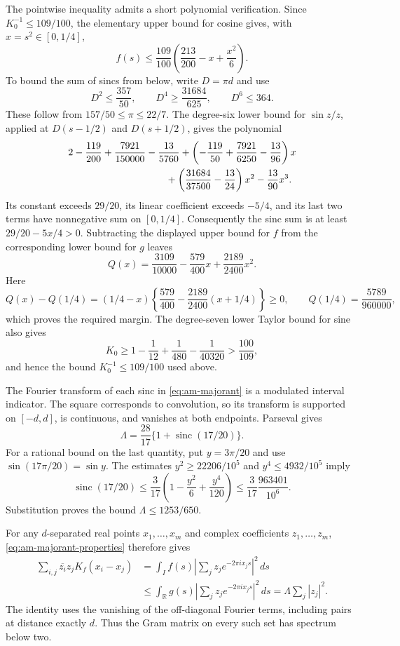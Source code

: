 \documentclass[11pt,reqno]{amsart}
\numberwithin{equation}{section}
\begin{document}
The pointwise inequality admits a short polynomial verification.
Since $K_0^{-1}\le109/100$, the elementary upper bound for cosine gives,
with $x=s^2\in[0,1/4]$,
\[
 f(s)\le\frac{109}{100}
       \left(\frac{213}{200}-x+\frac{x^2}{6}\right).
\]
To bound the sum of sincs from below, write $D=\pi d$ and use
\[
 D^2\le\frac{357}{50},\qquad
 D^4\ge\frac{31684}{625},\qquad D^6\le364.
\]
These follow from $157/50\le\pi\le22/7$. The degree-six lower
bound for $\sin z/z$, applied at $D(s-1/2)$ and $D(s+1/2)$,
gives the polynomial
\[
\begin{split}
 &2-\frac{119}{200}+\frac{7921}{150000}-\frac{13}{5760}
 +\left(-\frac{119}{50}+\frac{7921}{6250}-\frac{13}{96}\right)x\\
 &\hspace{35mm}
 +\left(\frac{31684}{37500}-\frac{13}{24}\right)x^2
 -\frac{13}{90}x^3.
\end{split}
\]
Its constant exceeds $29/20$, its linear coefficient exceeds $-5/4$,
and its last two terms have nonnegative sum on $[0,1/4]$.
Consequently the sinc sum is at least $29/20-5x/4>0$.
Subtracting the displayed upper bound for $f$ from the corresponding
lower bound for $g$ leaves
\[
 Q(x)=\frac{3109}{10000}-\frac{579}{400}x+
                         \frac{2189}{2400}x^2.
\]
Here
\[
 Q(x)-Q(1/4)
  =(1/4-x)\left\{\frac{579}{400}
                   -\frac{2189}{2400}(x+1/4)\right\}\ge0,
 \qquad Q(1/4)=\frac{5789}{960000},
\]
which proves the required margin. The degree-seven lower Taylor
bound for sine also gives
\[
 K_0\ge1-\frac1{12}+\frac1{480}-\frac1{40320}
       >\frac{100}{109},
\]
and hence the bound $K_0^{-1}\le109/100$ used above.

The Fourier transform of each sinc in \eqref{eq:am-majorant} is a
modulated interval indicator. The square corresponds to convolution,
so its transform is supported on $[-d,d]$, is continuous, and vanishes
at both endpoints. Parseval gives
\[
 \Lambda=\frac{28}{17}\{1+\operatorname{sinc}(17/20)\}.
\]
For a rational bound on the last quantity, put $y=3\pi/20$ and use
$\sin(17\pi/20)=\sin y$. The estimates
$y^2\ge22206/10^5$ and $y^4\le4932/10^5$ imply
\[
 \operatorname{sinc}(17/20)
 \le\frac3{17}\left(1-\frac{y^2}{6}+\frac{y^4}{120}\right)
 \le\frac3{17}\frac{963401}{10^6}.
\]
Substitution proves the bound $\Lambda\le1253/650$.

For any $d$-separated real points $x_1,\ldots,x_m$ and complex
coefficients $z_1,\ldots,z_m$, \eqref{eq:am-majorant-properties}
therefore gives
\begin{equation}
\begin{split}
 \sum_{i,j}\overline{z_i}z_jK_f(x_i-x_j)
 &=\int_I f(s)\left|\sum_jz_je^{-2\pi ix_js}\right|^2\,ds\\
 &\le\int_{\mathbb R}g(s)
                  \left|\sum_jz_je^{-2\pi ix_js}\right|^2\,ds
 =\Lambda\sum_j|z_j|^2.
\end{split}
\label{eq:am-separated-norm}
\end{equation}
The identity uses the vanishing of the off-diagonal Fourier terms,
including pairs at distance exactly $d$. Thus the Gram matrix on
every such set has spectrum below two.
\end{document}
